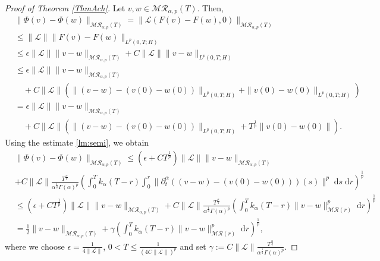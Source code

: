 \documentclass[reqno]{amsart}
\numberwithin{equation}{section}
\def \d {\mathrm{d}}
\begin{document}
\begin{proof}[Proof of Theorem \ref{ThmAch}]
Let $v,w\in \mathcal{M}\mathcal{R}_{\alpha,p}(T)$. Then,
 \begin{align*}
     &\|\Phi(v)-\Phi(w)\|_{\mathcal{M}\mathcal{R}_{\alpha,p}(T)}= \|\mathcal{L}(F(v)-F(w),0)\|_{\mathcal{M}\mathcal{R}_{\alpha,p}(T)}\\
     &\le \|\mathcal{L}\| \|F(v)-F(w)\|_{L^p(0,T;H)}\\
     &\le \epsilon \|\mathcal{L}\|\|v-w\|_{\mathcal{M}\mathcal{R}_{\alpha,p}(T)}+C\|\mathcal{L}\|\|v-w\|_{L^p(0,T;H)}\\
     &\le \epsilon \|\mathcal{L}\|\|v-w\|_{\mathcal{M}\mathcal{R}_{\alpha,p}(T)}\\
     &\quad+C\|\mathcal{L}\|\left(\|(v-w)-(v(0)-w(0))\|_{L^p(0,T;H)}+ \|v(0)-w(0)\|_{L^p(0,T;H)}\right)\\
     &= \epsilon \|\mathcal{L}\|\|v-w\|_{\mathcal{M}\mathcal{R}_{\alpha,p}(T)}\\
     &\quad+C\|\mathcal{L}\|\left(\|(v-w)-(v(0)-w(0))\|_{L^p(0,T;H)}+ T^{\frac{1}{p}} \|v(0)-w(0)\|\right).
 \end{align*}
Using the estimate \eqref{lm:semi}, we obtain
\begin{align*}
     &\|\Phi(v)-\Phi(w)\|_{\mathcal{M}\mathcal{R}_{\alpha,p}(T)}\le (\epsilon +CT^{\frac{1}{p}})\|\mathcal{L}\|\|v-w\|_{\mathcal{M}\mathcal{R}_{\alpha,p}(T)}\\
     &+C \|\mathcal{L}\|\frac{T^{\frac{\alpha }{q}}}{\alpha^{\frac{1}{q}}\Gamma(\alpha)^p}\left(\int^T_0 k_{\alpha}(T-r)
		\int_0^r\|\partial_t^\alpha ((v-w)-(v(0)-w(0)))(s)\|^p\;\d s\;\d r\right)^{\frac{1}{p}} \\
    &\le (\epsilon +CT^{\frac{1}{p}})\|\mathcal{L} \|\|v-w\|_{\mathcal{M}\mathcal{R}_{\alpha,p}(T)}
     +C \|\mathcal{L}\|\frac{T^{\frac{\alpha }{q}}}{\alpha^{\frac{1}{q}}\Gamma(\alpha)^p}\left(\int^T_0 k_{\alpha}(T-r)
		\|v-w\|^p_{\mathcal{M}\mathcal{R}(r)}\;\d r\right)^{\frac{1}{p}}\\
        & =\frac{1}{2}\|v-w\|_{\mathcal{M}\mathcal{R}_{\alpha,p}(T)}
     + \gamma\left(\int^T_0 k_{\alpha}(T-r)
		\|v-w\|^p_{\mathcal{M}\mathcal{R}(r)}\;\d r\right)^{\frac{1}{p}},
 \end{align*}
 where we choose $\epsilon=\frac{1}{4\|\mathcal{L}\|}$, $0<T\le \frac{1}{(4 C\|\mathcal{L}\|)^p}$ and set $\gamma:=C \|\mathcal{L}\|\frac{T^{\frac{\alpha }{q}}}{\alpha^{\frac{1}{q}}\Gamma(\alpha)^p}$.
 

\end{proof}
\end{document}
